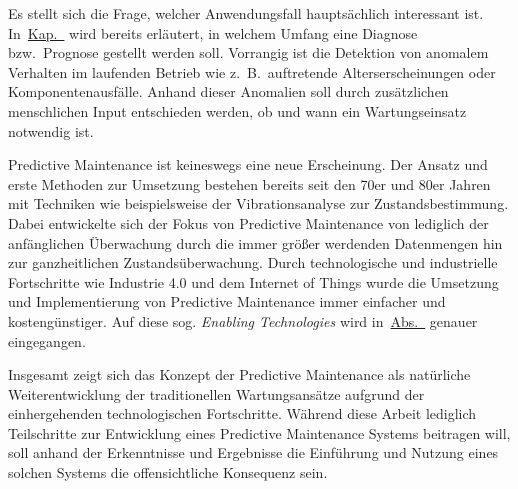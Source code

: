 Es stellt sich die Frage, welcher Anwendungsfall hauptsächlich interessant ist. In~\hyperref[ch:zielsetzung]{Kap.~}
wird bereits erläutert, in welchem Umfang eine Diagnose bzw.~Prognose gestellt werden soll. Vorrangig ist die Detektion von anomalem
Verhalten im laufenden Betrieb wie z.~B.~auftretende Alterserscheinungen oder Komponentenausfälle. Anhand dieser Anomalien soll durch
zusätzlichen menschlichen Input entschieden werden, ob und wann ein Wartungseinsatz notwendig ist.

Predictive Maintenance ist keineswegs eine neue Erscheinung. Der Ansatz und erste Methoden zur Umsetzung bestehen bereits seit den 70er
und 80er Jahren~\cite{Sandtorv1973, Renwick1985} mit Techniken wie beispielsweise der Vibrationsanalyse zur Zustandsbestimmung. Dabei
entwickelte sich der Fokus von Predictive Maintenance von lediglich der anfänglichen Überwachung durch die immer größer werdenden
Datenmengen hin zur ganzheitlichen Zustandsüberwachung. Durch technologische und industrielle Fortschritte wie Industrie 4.0 und dem
Internet of Things wurde die Umsetzung und Implementierung von Predictive Maintenance immer einfacher und kostengünstiger. Auf diese sog.
\textit{Enabling Technologies} wird in~\hyperref[sec:technologische_grundlagen]{Abs.~} genauer
eingegangen.

Insgesamt zeigt sich das Konzept der Predictive Maintenance als natürliche Weiterentwicklung der traditionellen Wartungsansätze aufgrund
der einhergehenden technologischen Fortschritte. Während diese Arbeit lediglich Teilschritte zur Entwicklung eines Predictive Maintenance
Systems beitragen will, soll anhand der Erkenntnisse und Ergebnisse die Einführung und Nutzung eines solchen Systems die offensichtliche
Konsequenz sein.